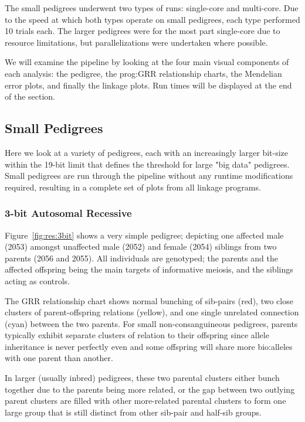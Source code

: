 The small pedigrees underwent two types of runs: single-core and multi-core. Due to the speed at which both types operate on small pedigrees, each type performed 10 trials each. The larger pedigrees were for the most part single-core due to resource limitations, but parallelizations were undertaken where possible. 

We will examine the pipeline by looking at the four main visual components of each analysis: the pedigree, the \gls{prog:GRR} relationship charts, the Mendelian error plots, and finally the linkage plots. Run times will be displayed at the end of the section.

\subsection{Small Pedigrees}

Here we look at a variety of pedigrees, each with an increasingly larger bit-size within the 19-bit limit that defines the threshold for large "big data" pedigrees. Small pedigrees are run through the pipeline without any runtime modifications required, resulting in a complete set of plots from all linkage programs.

\subsubsection*{3-bit Autosomal Recessive}


Figure~\ref{fig:res:3bit} shows a very simple pedigree; depicting one affected male (2053) amongst unaffected male (2052) and female (2054) siblings from two parents (2056 and 2055). All individuals are genotyped; the parents  and the affected offspring being the main targets of informative meiosis, and the siblings acting as controls.  

The GRR relationship chart shows normal bunching of sib-pairs (red), two close clusters of parent-offspring relations (yellow), and one single unrelated connection (cyan) between the two parents. For small non-consanguineous pedigrees, parents typically exhibit separate clusters of relation to their offspring since allele inheritance is never perfectly even and some offspring will share more \gls{bio:alleles} with one parent than another.

In larger (usually inbred) pedigrees, these two parental clusters either bunch together due to the parents being more related, or the gap between two outlying parent clusters are filled with other more-related parental clusters to form one large group that is still distinct from other sib-pair and half-sib groups.

